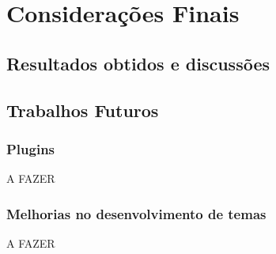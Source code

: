 \documentclass[ppginf, pep]{esinucpel}
\begin{document}
\chapter{Considerações Finais}

\section{Resultados obtidos e discussões}

\section{Trabalhos Futuros}

\subsection{Plugins}

A FAZER

\subsection{Melhorias no desenvolvimento de temas}

A FAZER




% 
\end{document}
